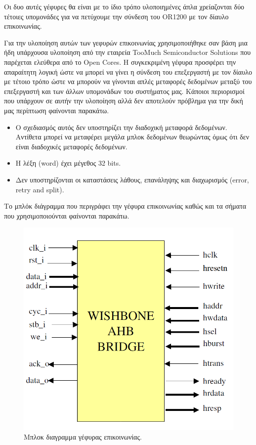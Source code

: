 \documentclass[a4paper,10pt]{article}
\numberwithin{figure}{section}
\numberwithin{table}{section}
\begin{document}
\vspace{0.7cm}

Οι δυο αυτές γέφυρες θα είναι με το ίδιο τρόπο υλοποιημένες άπλα χρείαζονται δύο τέτοιες υπομονάδες για να πετύχουμε την σύνδεση του OR1200 με τον δίαυλο επικοινωνίας.
\newline

Για την υλοποίηση αυτών των γεφυρών επικοινωνίας χρησιμοποιήθηκε σαν βάση μια ήδη υπάρχουσα υλοποίηση  από την εταιρεία TooMuch Semiconductor \newline Solutions που παρέχεται ελεύθερα από το Open Cores.
Η συγκεκριμένη γέφυρα προσφέρει την απαραίτητη λογική ώστε να μπορεί να γίνει η σύνδεση του επεξεργαστή με τον δίαυλο με τέτοιο τρόπο ώστε να μπορούν να γίνονται απλές μεταφορές δεδομένων μεταξύ του επεξεργαστή και των άλλων υπομονάδων του συστήματος μας.
Κάποιοι περιορισμοί που υπάρχουν σε αυτήν την υλοποίηση αλλά δεν αποτελούν πρόβλημα για την δική μας περίπτωση φαίνονται παρακάτω.
\begin{itemize}
 \item Ο σχεδιασμός αυτός δεν υποστηρίζει την διαδοχική μεταφορά δεδομένων. Αντίθετα μπορεί να μεταφέρει μεγάλα μπλοκ δεδομένων θεωρώντας όμως ότι δεν είναι διαδοχικές μεταφορές δεδομένων.
 \item Η λέξη (word) έχει μέγεθος 32 bits.
 \item Δεν υποστηρίζονται οι καταστάσεις λάθους, επανάληψης και διαχωρισμός (error, retry and split).
\end{itemize}

Το μπλόκ διάγραμμα που περιγράφει την γέφυρα επικοινωνίας καθώς και τα σήματα που χρησιμοποιούνται φαίνονται παρακάτω.

\begin{figure}[h!]
 \centering
 \includegraphics[bb=0 0 756 730,scale=0.4]{./Images/ahb_wb_ORIG.png}
 \caption{Μπλοκ διαγραμμα γέφυρας επικοινωνίας.}
\end{figure}
\end{document}
